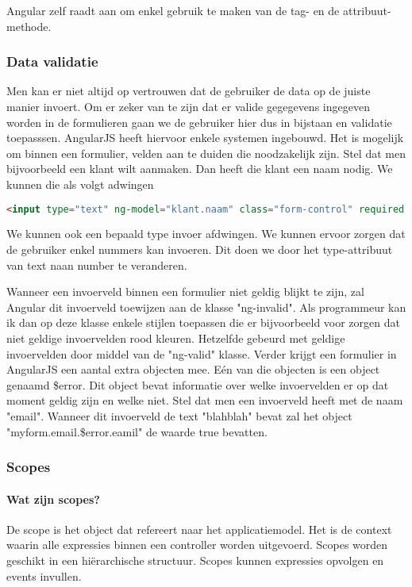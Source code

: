 \documentclass[a4paper,11pt]{article}
\begin{document}
Angular zelf raadt aan om enkel gebruik te maken van de tag- en de attribuut-methode.

\subsubsection{Data validatie}
Men kan er niet altijd op vertrouwen dat de gebruiker de data op de juiste manier invoert. Om er zeker van te zijn dat er valide gegegevens ingegeven worden in de formulieren gaan we de gebruiker hier dus in bijstaan en validatie toepasssen. AngularJS heeft hiervoor enkele systemen ingebouwd. Het is mogelijk om binnen een formulier, velden aan te duiden die noodzakelijk zijn. Stel dat men bijvoorbeeld een klant wilt aanmaken. Dan heeft die klant een naam nodig. We kunnen die als volgt adwingen
\begin{lstlisting}[language=html]
<input type="text" ng-model="klant.naam" class="form-control" required />
\end{lstlisting}

We kunnen ook een bepaald type invoer afdwingen. We kunnen ervoor zorgen dat de gebruiker enkel nummers kan invoeren. Dit doen we door het type-attribuut van text naan number te veranderen.

Wanneer een invoerveld binnen een formulier niet geldig blijkt te zijn, zal Angular dit invoerveld toewijzen aan de klasse "ng-invalid". Als programmeur kan ik dan op deze klasse enkele stijlen toepassen die er bijvoorbeeld voor zorgen dat niet geldige invoervelden rood kleuren. Hetzelfde gebeurd met geldige invoervelden door middel van de "ng-valid" klasse. Verder krijgt een formulier in AngularJS een aantal extra objecten mee. Eén van die objecten is een object genaamd \$error. Dit object bevat informatie over welke invoervelden er op dat moment geldig zijn en welke niet. Stel dat men een invoerveld heeft met de naam "email". Wanneer dit invoerveld de text "blahblah" bevat zal het object "myform.email.\$error.eamil" de waarde true bevatten.

\subsubsection{Scopes}
\paragraph{Wat zijn scopes?}
De scope is het object dat refereert naar het applicatiemodel. Het is de context waarin alle expressies binnen een controller worden uitgevoerd. Scopes worden geschikt in een hiërarchische structuur. Scopes kunnen expressies opvolgen en events invullen.\cite{angular:scopes}
\end{document}
